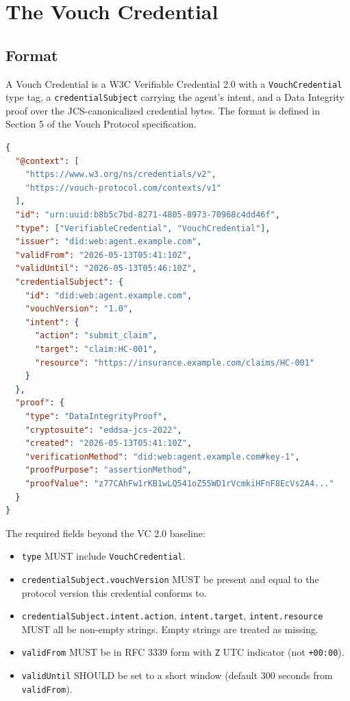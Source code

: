 \documentclass[11pt,a4paper]{article}
\begin{document}
\section{The Vouch Credential}
\label{sec:credential}

\subsection{Format}

A Vouch Credential is a W3C Verifiable Credential 2.0 with a \texttt{VouchCredential} type tag, a \verb|credentialSubject| carrying the agent's intent, and a Data Integrity proof over the JCS-canonicalized credential bytes. The format is defined in Section 5 of the Vouch Protocol specification.

\begin{lstlisting}[language=json]
{
  "@context": [
    "https://www.w3.org/ns/credentials/v2",
    "https://vouch-protocol.com/contexts/v1"
  ],
  "id": "urn:uuid:b8b5c7bd-8271-4805-8973-70968c4dd46f",
  "type": ["VerifiableCredential", "VouchCredential"],
  "issuer": "did:web:agent.example.com",
  "validFrom": "2026-05-13T05:41:10Z",
  "validUntil": "2026-05-13T05:46:10Z",
  "credentialSubject": {
    "id": "did:web:agent.example.com",
    "vouchVersion": "1.0",
    "intent": {
      "action": "submit_claim",
      "target": "claim:HC-001",
      "resource": "https://insurance.example.com/claims/HC-001"
    }
  },
  "proof": {
    "type": "DataIntegrityProof",
    "cryptosuite": "eddsa-jcs-2022",
    "created": "2026-05-13T05:41:10Z",
    "verificationMethod": "did:web:agent.example.com#key-1",
    "proofPurpose": "assertionMethod",
    "proofValue": "z77CAhFw1rKB1wLQ541oZ55WD1rVcmkiHFnF8EcVs2A4..."
  }
}
\end{lstlisting}

The required fields beyond the VC 2.0 baseline:

\begin{itemize}[leftmargin=*]
\item \verb|type| MUST include \verb|VouchCredential|.
\item \verb|credentialSubject.vouchVersion| MUST be present and equal to the protocol version this credential conforms to.
\item \verb|credentialSubject.intent.action|, \verb|intent.target|, \verb|intent.resource| MUST all be non-empty strings. Empty strings are treated as missing.
\item \verb|validFrom| MUST be in RFC 3339 form with \verb|Z| UTC indicator (not \verb|+00:00|).
\item \verb|validUntil| SHOULD be set to a short window (default 300 seconds from \verb|validFrom|).
\end{itemize}
\end{document}
